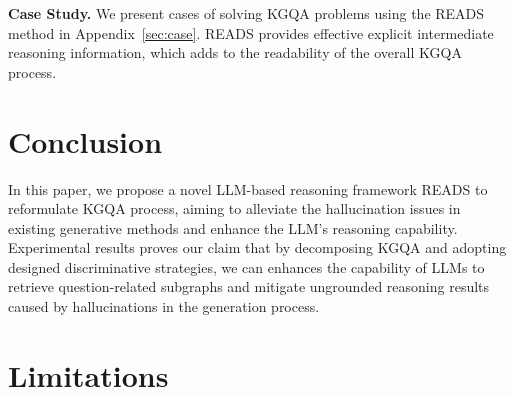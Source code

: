 \documentclass[11pt]{article}
\begin{document}
\begin{table}[h]
\centering
{}
\caption{The average model calls per question and average number of input/output tokens per request.}
\label{table:efficiency}
\end{table}

\noindent\textbf{Case Study.} We present cases of solving KGQA problems using the READS method in Appendix~\ref{sec:case}. READS provides effective explicit intermediate reasoning information, which adds to the readability of the overall KGQA process.

\section{Conclusion}
In this paper, we propose a novel LLM-based reasoning framework READS to reformulate KGQA process, aiming to alleviate the hallucination issues in existing generative methods and enhance the LLM's reasoning capability. Experimental results proves our claim that by decomposing KGQA and adopting designed discriminative strategies, we can enhances the capability of LLMs to retrieve question-related subgraphs and mitigate ungrounded reasoning results caused by hallucinations in the generation process.

\section*{Limitations}
\end{document}
